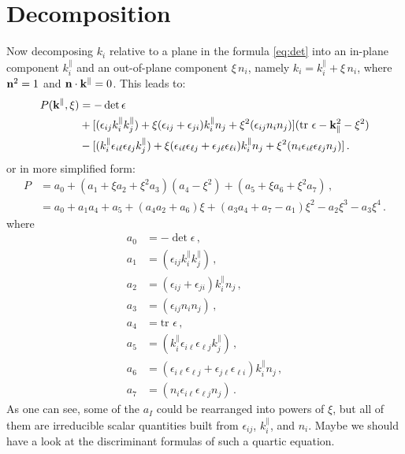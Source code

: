 \documentclass[a4paper,12pt]{article}
\newcommand{\vct}[1]{{\bf #1}}
\begin{document}
\section{Decomposition}
Now decomposing $k_i$ relative to a plane in the formula \eqref{eq:det} into an in-plane component $k_i^\parallel$ and an 
out-of-plane component $\xi\,n_i$, namely $k_i = k_i^\parallel + \xi\,n_i$, where $\vct{n}^2 = 1$ and 
$\vct{n}\cdot\vct{k}^\parallel = 0$.
This leads to:
\begin{align}
 P(\vct{k}^\parallel, \xi) &= -\det\epsilon\nonumber\\& 
  + [(\epsilon_{ij} k^\parallel_i k^\parallel_j) 
    + \xi (\epsilon_{ij} + \epsilon_{ji}) k_i^\parallel n_j 
    + \xi^2 (\epsilon_{ij} n_i n_j)](\text{tr }\epsilon - \vct{k}^2_\parallel - \xi^2)\nonumber\\&
  - [(k^\parallel_i \epsilon_{i\ell} \epsilon_{\ell j} k^\parallel_j)
     + \xi (\epsilon_{i\ell} \epsilon_{\ell j} + \epsilon_{j\ell} \epsilon_{\ell i}) k_i^\parallel n_j
     + \xi^2 (n_i \epsilon_{i\ell} \epsilon_{\ell j} n_j)]\,.
\end{align}
or in more simplified form:
\begin{align}
 P &= a_0 + (a_1 + \xi a_2 + \xi^2 a_3) (a_4 - \xi^2) + (a_5 + \xi a_6 + \xi^2 a_7)\,,\nonumber\\
 &= a_0 + a_1 a_4 + a_5 + (a_4 a_2 + a_6) \xi + (a_3 a_4 + a_7 - a_1) \xi^2 - a_2 \xi^3 - a_3 \xi^4\,.
\end{align}
where
\begin{subequations}
\begin{align}
  a_0 &= -\det\epsilon\,,\\
  a_1 &= (\epsilon_{ij} k^\parallel_i k^\parallel_j)\,,\\
  a_2 &= (\epsilon_{ij} + \epsilon_{ji}) k_i^\parallel n_j\,,\\
  a_3 &= (\epsilon_{ij} n_i n_j)\,,\\
  a_4 &= \text{tr }\epsilon\,,\\
  a_5 &= (k^\parallel_i \epsilon_{i\ell} \epsilon_{\ell j} k^\parallel_j)\,,\\
  a_6 &= (\epsilon_{i\ell} \epsilon_{\ell j} + \epsilon_{j\ell} \epsilon_{\ell i}) k_i^\parallel n_j\,,\\
  a_7 &= (n_i \epsilon_{i\ell} \epsilon_{\ell j} n_j)\,.
\end{align}
\end{subequations}
As one can see, some of the $a_I$ could be rearranged into powers of $\xi$, but all of them are irreducible scalar quantities
built from $\epsilon_{ij}$, $k_i^\parallel$, and $n_i$. Maybe we should have a look at the discriminant formulas of such a
quartic equation. 
\end{document}
